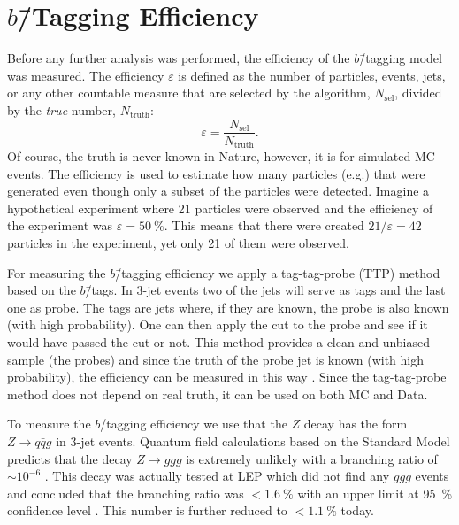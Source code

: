 \section[b-Tagging Efficiency]{$b$\=/Tagging Efficiency}
\label{sec:q:b_tagging_effiency}

Before any further analysis was performed, the efficiency of the $b$\=/tagging model was measured. The efficiency $\varepsilon$ is defined as the number of particles, events, jets, or any other countable measure that are selected by the algorithm, $N_\mathrm{sel}$, divided by the \emph{true} number, $N_\mathrm{truth}$:
\begin{equation}
  \varepsilon = \frac{N_\mathrm{sel}}{N_\mathrm{truth}}. 
\end{equation}
Of course, the truth is never known in Nature, however, it is for simulated MC events. The efficiency is used to estimate how many particles (e.g.) that were generated even though only a subset of the particles were detected. Imagine a hypothetical experiment where \num{21} particles were observed and the efficiency of the experiment was $\varepsilon=\SI{50}{\percent}$. This means that there were created $21 / \varepsilon = 42$ particles in the experiment, yet only \num{21} of them were observed.

For measuring the $b$\=/tagging efficiency we apply a tag-tag-probe (TTP) method based on the $b$\=/tags. In 3-jet events two of the jets will serve as tags and the last one as probe. The tags are jets where, if they are known, the probe is also known (with high probability). One can then apply the cut to the probe and see if it would have passed the cut or not. This method provides a clean and unbiased sample (the probes) and since the truth of the probe jet is known (with high probability), the efficiency can be measured in this way \autocite{atlascollaborationElectronEfficiencyMeasurements2017}. Since the tag-tag-probe method does not depend on real truth, it can be used on both MC and Data.

To measure the $b$\=/tagging efficiency we use that the $Z$ decay has the form $Z \rightarrow q\bar{q}g$ in 3-jet events. Quantum field calculations based on the Standard Model predicts that the decay $Z \rightarrow ggg$ is extremely unlikely with a branching ratio of ${\sim} 10^{-6}$ \autocite{vanderbijBosonProductionDecay1989}. This decay was actually tested at LEP which did not find any $ggg$ events and concluded that the branching ratio was $< \SI{1.6}{\percent}$ with an upper limit at \SI{95}{\percent} confidence level \autocite{damUpperLimitBr1996}. This number is further reduced to $<\SI{1.1}{\percent}$ today\autocite{particledatagroupReviewParticlePhysics2018}. 

